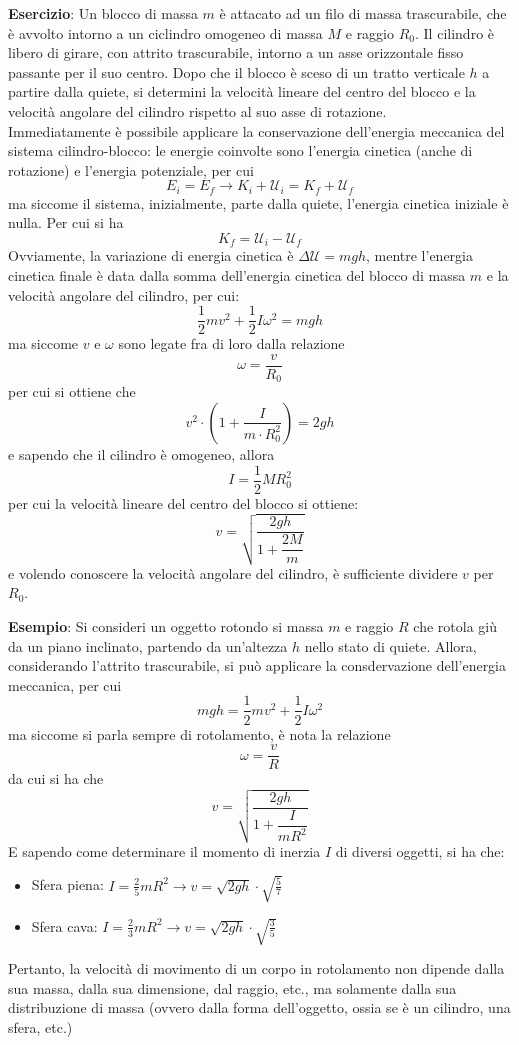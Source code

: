 \documentclass[a4paper]{extarticle}
\begin{document}
\vspace{1em}
\noindent
\textbf{Esercizio}: Un blocco di massa $m$ è attacato ad un filo di massa trascurabile, che è avvolto intorno a un ciclindro omogeneo di massa $M$ e raggio $R_0$. Il cilindro è libero di girare, con attrito trascurabile, intorno a un asse orizzontale fisso passante per il suo centro. Dopo che il blocco è sceso di un tratto verticale $h$ a partire dalla quiete, si determini la velocità lineare del centro del blocco e la velocità angolare del cilindro rispetto al suo asse di rotazione.\\
Immediatamente è possibile applicare la conservazione dell'energia meccanica del sistema cilindro-blocco: le energie coinvolte sono l'energia cinetica (anche di rotazione) e l'energia potenziale, per cui
\[E_i=E_f \longrightarrow K_i+\mathcal{U}_i=K_f+\mathcal{U}_f\]
ma siccome il sistema, inizialmente, parte dalla quiete, l'energia cinetica iniziale è nulla. Per cui si ha
\[K_f=\mathcal{U}_i-\mathcal{U}_f\]
Ovviamente, la variazione di energia cinetica è $\Delta \mathcal{U}=mgh$, mentre l'energia cinetica finale è data dalla somma dell'energia cinetica del blocco di massa $m$ e la velocità angolare del cilindro, per cui:
\[\frac{1}{2}mv^2 + \frac{1}{2}I\omega^2 = mgh\]
ma siccome $v$ e $\omega$ sono legate fra di loro dalla relazione
\[\omega=\frac{v}{R_0}\]
per cui si ottiene che
\[v^2 \cdot \left(1 + \frac{I}{m \cdot R_0^2}\right) = 2gh\]
e sapendo che il cilindro è omogeneo, allora
\[I=\frac{1}{2} M R_0^2\]
per cui la velocità lineare del centro del blocco si ottiene:
\[v = \sqrt{\frac{2gh}{1 + \dfrac{2M}{m}}}\]
e volendo conoscere la velocità angolare del cilindro, è sufficiente dividere $v$ per $R_0$.

\vspace{1em}
\noindent
\textbf{Esempio}: Si consideri un oggetto rotondo si massa $m$ e raggio $R$ che rotola giù da un piano inclinato, partendo da un'altezza $h$ nello stato di quiete. Allora, considerando l'attrito trascurabile, si può applicare la consdervazione dell'energia meccanica, per cui
\[mgh=\frac{1}{2}mv^2 + \frac{1}{2}I\omega^2\]
ma siccome si parla sempre di rotolamento, è nota la relazione
\[\omega=\frac{v}{R}\]
da cui si ha che
\[\boxed{v=\sqrt{\frac{2gh}{1 + \dfrac{I}{mR^2}}}}\]
E sapendo come determinare il momento di inerzia $I$ di diversi oggetti, si ha che:
\begin{itemize}
  \item Sfera piena: $I=\frac{2}{5}mR^2 \longrightarrow v=\sqrt{2gh} \cdot \sqrt{\frac{5}{7}}$
  \item Sfera cava: $I=\frac{2}{3}mR^2 \longrightarrow v=\sqrt{2gh} \cdot \sqrt{\frac{3}{5}}$
\end{itemize}
Pertanto, la velocità di movimento di un corpo in rotolamento non dipende dalla sua massa, dalla sua dimensione, dal raggio, etc., ma solamente dalla sua distribuzione di massa (ovvero dalla forma dell'oggetto, ossia se è un cilindro, una sfera, etc.)
\end{document}
